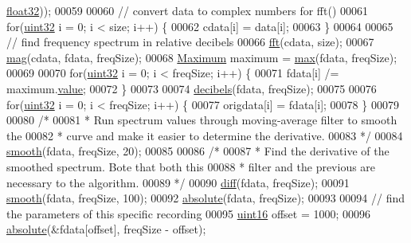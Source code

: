 \begin{DoxyCode}
      \hyperlink{definitions_8hpp_aacdc525d6f7bddb3ae95d5c311bd06a1}{float32}));
00059 
00060         \textcolor{comment}{// convert data to complex numbers for fft()}
00061         \textcolor{keywordflow}{for}(\hyperlink{definitions_8hpp_a1134b580f8da4de94ca6b1de4d37975e}{uint32} i = 0; i < size; i++) \{
00062             cdata[i] = data[i];
00063         \}
00064     
00065         \textcolor{comment}{// find frequency spectrum in relative decibels}
00066         \hyperlink{namespaceavda_a33a1102422421212ac6b9387c896e864}{fft}(cdata, size);
00067         \hyperlink{namespaceavda_a213bd6384fc9a330e4db2cecdbcd73ee}{mag}(cdata, fdata, freqSize);
00068         \hyperlink{structMaximum}{Maximum} maximum = \hyperlink{namespaceavda_aa82021c3ee552773c060b1a39caf8aaa}{max}(fdata, freqSize);
00069 
00070         \textcolor{keywordflow}{for}(\hyperlink{definitions_8hpp_a1134b580f8da4de94ca6b1de4d37975e}{uint32} i = 0; i < freqSize; i++) \{
00071             fdata[i] /= maximum.\hyperlink{structMaximum_aa7e84cbf37b694670142670014366969}{value};
00072         \}
00073 
00074         \hyperlink{namespaceavda_a9c0b7f832eace3cbc9c5dddea2ecc9d5}{decibels}(fdata, freqSize);
00075 
00076         \textcolor{keywordflow}{for}(\hyperlink{definitions_8hpp_a1134b580f8da4de94ca6b1de4d37975e}{uint32} i = 0; i < freqSize; i++) \{
00077             origdata[i] = fdata[i];
00078         \}
00079 
00080         \textcolor{comment}{/*}
00081 \textcolor{comment}{         * Run spectrum values through moving-average filter to smooth the}
00082 \textcolor{comment}{         * curve and make it easier to determine the derivative.}
00083 \textcolor{comment}{         */}
00084         \hyperlink{namespaceavda_a22583ba7f11b69c955b13155bf9a739d}{smooth}(fdata, freqSize, 20);
00085 
00086         \textcolor{comment}{/*}
00087 \textcolor{comment}{         * Find the derivative of the smoothed spectrum. Bote that both this}
00088 \textcolor{comment}{         * filter and the previous are necessary to the algorithm.}
00089 \textcolor{comment}{         */}
00090         \hyperlink{namespaceavda_a3e9b92cfa9d76c4c363e8ed8a4c1a2ce}{diff}(fdata, freqSize);
00091         \hyperlink{namespaceavda_a22583ba7f11b69c955b13155bf9a739d}{smooth}(fdata, freqSize, 100);
00092         \hyperlink{namespaceavda_aa771d0ed99fc4954c643ea71e91905bf}{absolute}(fdata, freqSize);
00093 
00094         \textcolor{comment}{// find the parameters of this specific recording}
00095         \hyperlink{definitions_8hpp_a05f6b0ae8f6a6e135b0e290c25fe0e4e}{uint16} offset = 1000;
00096         \hyperlink{namespaceavda_aa771d0ed99fc4954c643ea71e91905bf}{absolute}(&fdata[offset], freqSize - offset);

\end{DoxyCode}
